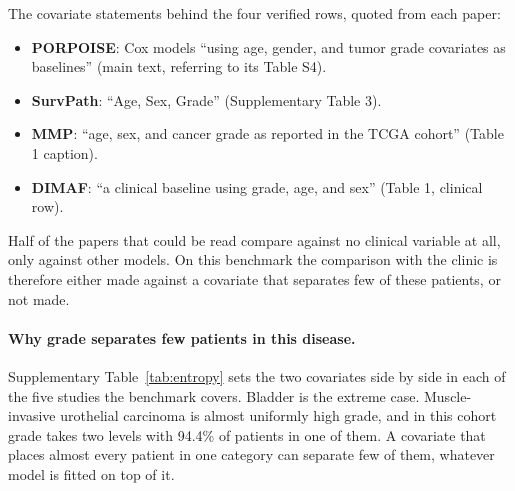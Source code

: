 \documentclass[11pt]{article}
\begin{document}
\noindent The covariate statements behind the four verified rows, quoted from each paper:
\begin{itemize}
  \item \textbf{PORPOISE}: Cox models ``using age, gender, and tumor grade covariates as
    baselines'' (main text, referring to its Table S4).
  \item \textbf{SurvPath}: ``Age, Sex, Grade'' (Supplementary Table 3).
  \item \textbf{MMP}: ``age, sex, and cancer grade as reported in the TCGA cohort'' (Table 1
    caption).
  \item \textbf{DIMAF}: ``a clinical baseline using grade, age, and sex'' (Table 1, clinical row).
\end{itemize}

\noindent Half of the papers that could be read compare against no clinical variable at all, only
against other models. On this benchmark the comparison with the clinic is therefore either made
against a covariate that separates few of these patients, or not made.

\paragraph{Why grade separates few patients in this disease.} Supplementary Table~\ref{tab:entropy} sets the
two covariates side by side in each of the five studies the benchmark covers. Bladder is the extreme
case. Muscle-invasive urothelial carcinoma is almost uniformly high grade, and in this cohort grade
takes two levels with 94.4\% of patients in one of them. A covariate that places almost every
patient in one category can separate few of them, whatever model is fitted on top of it.
\end{document}
